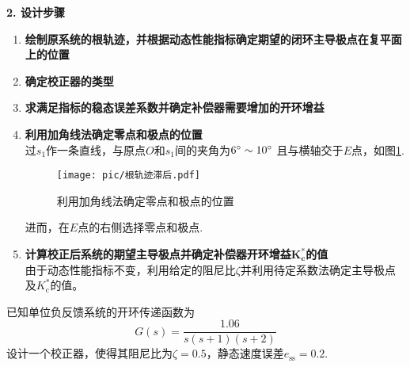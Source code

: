 \noindent \textbf{2. 设计步骤}
\begin{enumerate}
	\item \textbf{绘制原系统的根轨迹，并根据动态性能指标确定期望的闭环主导极点在复平面上的位置}
	\item \textbf{确定校正器的类型}
	\item \textbf{求满足指标的稳态误差系数并确定补偿器需要增加的开环增益}
	\item \textbf{利用加角线法确定零点和极点的位置}\\
	过$s_1$作一条直线，与原点$O$和$s_1$间的夹角为$6{}^{\circ} \sim 10{}^{\circ}$ 且与横轴交于$E$点，如图\ref{根轨迹滞后}.
	\begin{figure}[!htb]
		\centering
		\texttt{[image: pic/根轨迹滞后.pdf]}
		\vspace*{-1em}
		\caption{利用加角线法确定零点和极点的位置}
		\label{根轨迹滞后}
	\end{figure}

	进而，在$E$点的右侧选择零点和极点.
	\item \textbf{计算校正后系统的期望主导极点并确定补偿器开环增益$\bm{K_\text{c}^*}$的值}\\
	由于动态性能指标不变，利用给定的阻尼比$\zeta$并利用待定系数法确定主导极点及$K_\text{c}^*$的值。
\end{enumerate}

\examples \label{6.5} 已知单位负反馈系统的开环传递函数为
\[
G(s) = \dfrac{1.06}{s(s+1)(s+2)}
\]
设计一个校正器，使得其阻尼比为$\zeta = 0.5$，静态速度误差$e_{\text{ss}} = 0.2.$

